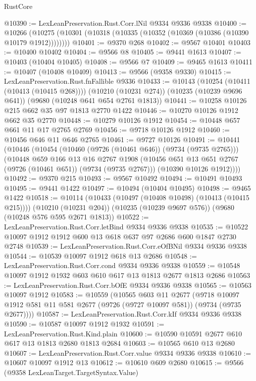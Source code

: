 \begin{lexlean}{RustCore}
\begin{coremodule}
@10390 := LexLeanPreservation.Rust.Corr.lNil @9334 @9336 @9338
@10400 := @10266
    (@10275 (@10301 (@10318 (@10335 (@10352 (@10369 (@10386 (@10390 @10179 @1912))))))))
@10401 := @9370 @268
@10402 := @9567 @10401
@10403 := @10400 @10402
@10404 := @9566 @8
@10405 := @9441 @1613
@10407 := @10403 (@10404 @10405)
@10408 := @9566 @7
@10409 := @9465 @1613
@10411 := @10407 (@10408 @10409)
@10413 := @9566 (@9358 @9330)
@10415 := LexLeanPreservation.Rust.fnFallible @9336
@10433 := @10143
    (@10254 (@10411 (@10413 (@10415 @268))))
    (@10210 (@10231 @274))
    (@10235 (@10239 @9696 @641))
    (@9680 (@10248 @641 @654 @2761 @1813))
@10441 := @10258 @10126 @215 @662 @35 @97 @1813 @2770 @1422
@10446 := @10270 @10126 @1912 @662 @35 @2770
@10448 := @10279 @10126 @1912
@10454 := @10448 @657 @661 @11 @17 @2765 @2769
@10456 := @9718 @10126 @1912
@10460 := @10456 @646 @11 @646 @2765
@10461 := @9727 @10126
@10491 := @10441
    (@10446
      (@10454
        (@10460 (@9726 (@10461 @646)) (@9734 (@9735 @2765)))
        (@10448
          @659
          @166
          @13
          @16
          @2767
          @1908
          (@10456 @651 @13 @651 @2767 (@9726 (@10461 @651)) (@9734 (@9735 @2767)))
          (@10390 @10126 @1912))))
@10492 := @9370 @215
@10493 := @9567 @10492
@10494 := @10491 @10493
@10495 := @9441 @1422
@10497 := @10494 (@10404 @10495)
@10498 := @9465 @1422
@10518 := @10114
    (@10433 (@10497 (@10408 @10498) (@10413 (@10415 @215))))
    (@10210 (@10231 @204))
    (@10235 (@10239 @9697 @576))
    (@9680 (@10248 @576 @595 @2671 @1813))
@10522 := LexLeanPreservation.Rust.Corr.letBind @9334 @9336 @9338
@10535 := @10522 @10097 @1912 @1912 @600 @13 @618 @637 @97 @2686 @600 @1847 @2730 @2748
@10539 := LexLeanPreservation.Rust.Corr.eOfBNil @9334 @9336 @9338
@10544 := @10539 @10097 @1912 @618 @13 @2686
@10548 := LexLeanPreservation.Rust.Corr.cond @9334 @9336 @9338
@10559 := @10548 @10097 @1912 @1932 @603 @610 @617 @13 @1813 @2677 @1813 @2686
@10563 := LexLeanPreservation.Rust.Corr.bOfE @9334 @9336 @9338
@10565 := @10563 @10097 @1912
@10583 := @10559
    (@10565
      @603
      @11
      @2677
      (@9718 @10097 @1912 @581 @11 @581 @2677 (@9726 (@9727 @10097 @581)) (@9734 (@9735 @2677))))
@10587 := LexLeanPreservation.Rust.Corr.kIf @9334 @9336 @9338
@10590 := @10587 @10097 @1912 @1932
@10591 := LexLeanPreservation.Rust.Kind.plain
@10600 := @10590 @10591 @2677 @610 @617 @13 @1813 @2680 @1813 @2684
@10603 := @10565 @610 @13 @2680
@10607 := LexLeanPreservation.Rust.Corr.value @9334 @9336 @9338
@10610 := @10607 @10097 @1912 @13
@10612 := @10610 @609 @2680
@10615 := @9566 (@9358 LexLeanTarget.TargetSyntax.Value)

\end{coremodule}
\end{lexlean}
